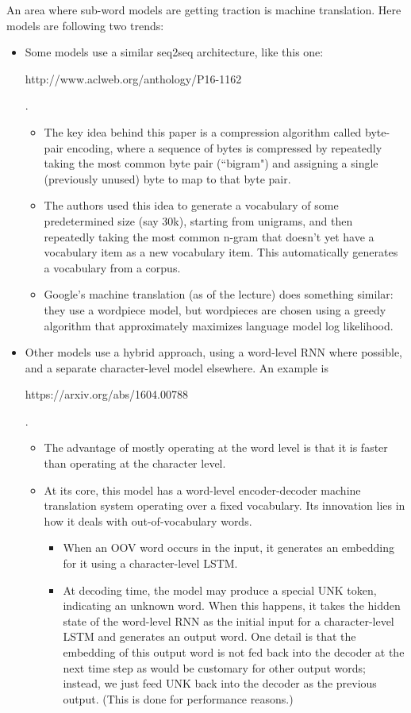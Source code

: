 An area where sub-word models are getting traction is machine translation. Here models are following two trends:
\begin{itemize}
\item Some models use a similar seq2seq architecture, like this one: \begin{tt}http://www.aclweb.org/anthology/P16-1162\end{tt}.
\begin{itemize}
\item The key idea behind this paper is a compression algorithm called byte-pair encoding, where a sequence of bytes is compressed by repeatedly taking the most common byte pair (``bigram") and assigning a single (previously unused) byte to map to that byte pair. 
\item The authors used this idea to generate a vocabulary of some predetermined size (say 30k), starting from unigrams, and then repeatedly taking the most common n-gram that doesn't yet have a vocabulary item as a new vocabulary item. This automatically generates a vocabulary from a corpus.
\item Google's machine translation (as of the lecture) does something similar: they use a wordpiece model, but wordpieces are chosen using a greedy algorithm that approximately maximizes language model log likelihood.
\end{itemize}
\item Other models use a hybrid approach, using a word-level RNN where possible, and a separate character-level model elsewhere. An example is \begin{tt}https://arxiv.org/abs/1604.00788\end{tt}.
\begin{itemize}
\item The advantage of mostly operating at the word level is that it is faster than operating at the character level. 
\item At its core, this model has a word-level encoder-decoder machine translation system operating over a fixed vocabulary. Its innovation lies in how it deals with out-of-vocabulary words.
\begin{itemize}
\item When an OOV word occurs in the input, it generates an embedding for it using a character-level LSTM.
\item At decoding time, the model may produce a special UNK token, indicating an unknown word. When this happens, it takes the hidden state of the word-level RNN as the initial input for a character-level LSTM and generates an output word. One detail is that the embedding of this output word is not fed back into the decoder at the next time step as would be customary for other output words; instead, we just feed UNK back into the decoder as the previous output. (This is done for performance reasons.)

\end{itemize}
\end{itemize}
\end{itemize}
